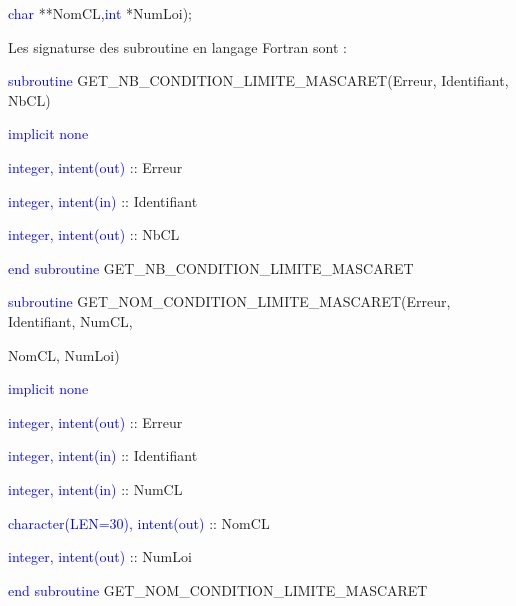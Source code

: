 \documentclass[a4paper,11pt]{article}
\begin{document}
 \textcolor{blue}{char} **NomCL,\textcolor{blue}{int} *NumLoi);
 
 \vspace{0.5cm} 
 
 Les signaturse des subroutine en langage Fortran sont :
 
 \vspace{0.5cm}
 
    \textcolor{blue}{subroutine} GET\_NB\_CONDITION\_LIMITE\_MASCARET(Erreur, Identifiant, NbCL)
    
        \hspace{1cm}\textcolor{blue}{implicit none}                 
        
        \hspace{1cm} \textcolor{blue}{integer, intent(out)} :: Erreur
        
        \hspace{1cm} \textcolor{blue}{integer, intent(in)} :: Identifiant
        
        \hspace{1cm} \textcolor{blue}{integer, intent(out)} :: NbCL
        
    \textcolor{blue}{end subroutine} GET\_NB\_CONDITION\_LIMITE\_MASCARET
    
    \textcolor{blue}{subroutine} GET\_NOM\_CONDITION\_LIMITE\_MASCARET(Erreur, Identifiant, NumCL,
    
     NomCL, NumLoi)
    
        \hspace{1cm}\textcolor{blue}{implicit none}                 
        
        \hspace{1cm} \textcolor{blue}{integer, intent(out)} :: Erreur
        
        \hspace{1cm} \textcolor{blue}{integer, intent(in)} :: Identifiant
        
        \hspace{1cm} \textcolor{blue}{integer, intent(in)} :: NumCL
        
        \hspace{1cm} \textcolor{blue}{character(LEN=30), intent(out)} :: NomCL
        
        \hspace{1cm} \textcolor{blue}{integer, intent(out)} :: NumLoi
        
    \textcolor{blue}{end subroutine} GET\_NOM\_CONDITION\_LIMITE\_MASCARET
    
 \vspace{0.5cm}
 
\end{document}
